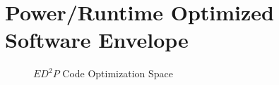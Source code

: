 \section{Power/Runtime Optimized Software Envelope}
\begin{figure}

\caption{$ED^2P$ Code Optimization Space}
\label{fig:modeldraw}
\end{figure}